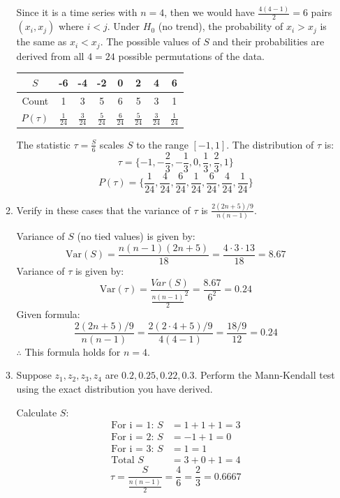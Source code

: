 \documentclass[12pt]{article}
\begin{document}
\begin{enumerate}
\begin{enumerate}
            Since it is a time series with $n = 4$, then we would have $\frac{4(4-1)}{2} = 6$ pairs $(x_i, x_j)$ 
            where $i < j$. Under $H_0$ (no trend), the probability of $x_i > x_j$ is the same as $x_i < x_j$. 
            The possible values of $S$ and their probabilities are derived from all $4\! = 24$ possible permutations of the data.
            \begin{table}[h]
                \centering
                \begin{tabular}{c c c c c c c c}
                    \hline
                    $S$ & -6 & -4 & -2 & 0 & 2 & 4 & 6 \\
                    \hline
                    Count & 1 & 3 & 5 & 6 & 5 & 3 & 1 \\
                    \hline
                    $P(\tau)$
                    &  $\frac{1}{24}$ & $\frac{3}{24}$ & $\frac{5}{24}$ & $\frac{6}{24}$ & $\frac{5}{24}$ & $\frac{3}{24}$ & $\frac{1}{24}$ \\
                    \hline
                \end{tabular}
            \end{table}
            The statistic $\tau = \frac{S}{6}$ scales $S$ to the range $[-1, 1]$. The distribution of $\tau$ is:
            \[\tau = \{-1, -\frac{2}{3}, -\frac{1}{3}, 0, \frac{1}{3}, \frac{2}{3}, 1\}\]
            \[P(\tau) = \{\frac{1}{24}, \frac{4}{24}, \frac{6}{24}, \frac{1}{24}, \frac{6}{24}, \frac{4}{24}, \frac{1}{24}\}\]
            \item Verify in these cases that the variance of \( \tau \) is \( \frac{2(2n+5)/9}{n(n-1)} \).
            
            Variance of $S$ (no tied values) is given by:
            \[ \text{Var}(S) = \frac{n(n-1)(2n+5)}{18} = \frac{4 \cdot 3 \cdot 13}{18} = 8.67 \]
            Variance of $\tau$ is given by:
            \[ \text{Var}(\tau) = \frac{Var(S)}{\frac{n(n-1)}{2}^2} = \frac{8.67}{6^2} = 0.24 \]
            Given formula:
            \[ \frac{2(2n+5)/9}{n(n-1)} = \frac{2(2 \cdot 4 + 5)/9}{4(4-1)} = \frac{18/9}{12} = 0.24 \]
            $\therefore$ This formula holds for $n = 4$.
            \item Suppose \( z_1, z_2, z_3, z_4 \) are \( 0.2, 0.25, 0.22, 0.3 \). Perform the Mann-Kendall test using the exact distribution you have derived.
            
            Calculate $S$:
            \begin{align*}
                \text{For i = 1: } S &= 1 + 1 + 1 = 3 \\
                \text{For i = 2: } S &= -1 + 1 = 0 \\
                \text{For i = 3: } S &= 1 = 1 \\
                \text{Total } S &= 3 + 0 + 1 = 4
            \end{align*}
            \[ \tau = \frac{S}{\frac{n(n-1)}{2}} = \frac{4}{6} = \frac{2}{3} = 0.6667 \]


\end{enumerate}
\end{enumerate}
\end{document}
